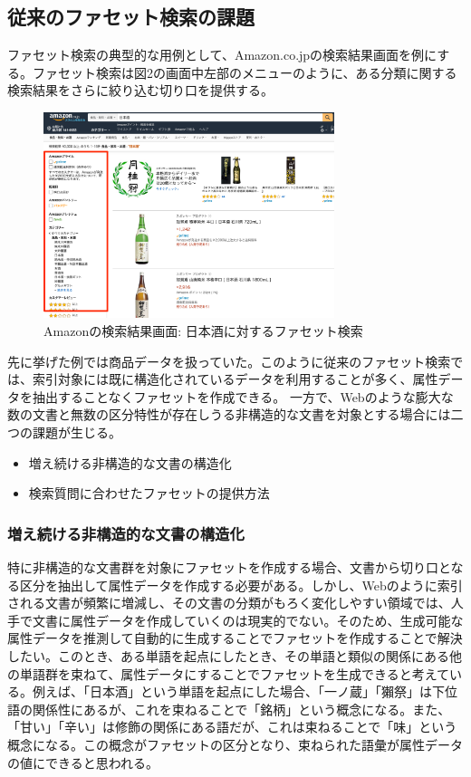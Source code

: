 \documentclass[a4j,10pt, twocolumn]{jarticle} \usepackage[dvipdfmx]{graphicx} \usepackage{amssymb} \usepackage{amsmath}
\begin{document}
\subsection{従来のファセット検索の課題}
 ファセット検索の典型的な用例として、Amazon.co.jp\cite{amazon}の検索結果画面を例にする。ファセット検索は図2の画面中左部のメニューのように、ある分類に関する検索結果をさらに絞り込む切り口を提供する。
 \begin{figure}[h]
   \includegraphics[width=85mm]{./amazon.png}
   \caption{Amazonの検索結果画面: 日本酒に対するファセット検索}
 \end{figure}
  先に挙げた例では商品データを扱っていた。このように従来のファセット検索では、索引対象には既に構造化されているデータを利用することが多く、属性データを抽出することなくファセットを作成できる。
  一方で、Webのような膨大な数の文書と無数の区分特性が存在しうる非構造的な文書を対象とする場合には二つの課題が生じる。
\begin{itemize}
  \item 増え続ける非構造的な文書の構造化
  \item 検索質問に合わせたファセットの提供方法
\end{itemize}

\subsubsection{増え続ける非構造的な文書の構造化}
特に非構造的な文書群を対象にファセットを作成する場合、文書から切り口となる区分を抽出して属性データを作成する必要がある。しかし、Webのように索引される文書が頻繁に増減し、その文書の分類がもろく変化しやすい領域では、人手で文書に属性データを作成していくのは現実的でない。そのため、生成可能な属性データを推測して自動的に生成することでファセットを作成することで解決したい。このとき、ある単語を起点にしたとき、その単語と類似の関係にある他の単語群を束ねて、属性データにすることでファセットを生成できると考えている。例えば、「日本酒」という単語を起点にした場合、「一ノ蔵」「獺祭」は下位語の関係性にあるが、これを束ねることで「銘柄」という概念になる。また、「甘い」「辛い」は修飾の関係にある語だが、これは束ねることで「味」という概念になる。この概念がファセットの区分となり、束ねられた語彙が属性データの値にできると思われる。
\end{document}
